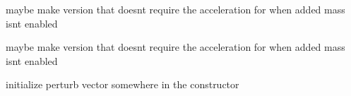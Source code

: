 
\begin{DoxyRefList}
\item[Member \mbox{\hyperlink{class_aero_dyn___interface___wrapper_a22f49f937a36e78a1a3609e0a4abdc66}{Aero\+Dyn\+\_\+\+Interface\+\_\+\+Wrapper\+::Init\+Inflows}} (const std\+::vector$<$ double $>$ \&inflow\+Vel, const std\+::vector$<$ double $>$ \&inflow\+Acc)]\label{todo__todo000001}%
%
maybe make version that doesn\textquotesingle{}t require the acceleration for when added mass isn\textquotesingle{}t enabled  
\item[Member \mbox{\hyperlink{class_aero_dyn___interface___wrapper_a008b9580fca86c4edaa714b716b82f2c}{Aero\+Dyn\+\_\+\+Interface\+\_\+\+Wrapper\+::Set\+\_\+\+Inputs\+\_\+\+Inflow}} (const std\+::vector$<$ double $>$ \&inflow\+Vel, const std\+::vector$<$ double $>$ \&inflow\+Acc)]\label{todo__todo000002}%
%
maybe make version that doesn\textquotesingle{}t require the acceleration for when added mass isn\textquotesingle{}t enabled  
\item[Member \mbox{\hyperlink{class_aero_dyn_turbine_af794c650277f55b4c2a30d5be5104f24}{Aero\+Dyn\+Turbine\+::Calc\+Outputs\+\_\+\+And\+\_\+\+Solve\+Inputs}} ()]\label{todo__todo000003}%
%
initialize perturb vector somewhere in the constructor 
\end{DoxyRefList}